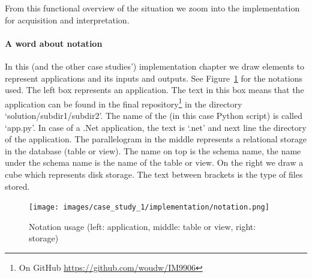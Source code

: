 \documentclass{ou-report}
\begin{document}
From this functional overview of the situation we zoom into the implementation
for acquisition and interpretation.

\paragraph{A word about notation}
In this (and the other case studies') implementation chapter we draw elements to
represent applications and its inputs and outputs. See Figure~\ref{fig:notation}
for the notations used. 
The left box represents an application. The text in this box means that
the application can be found in the final repository\footnote{On GitHub
\url{https://github.com/woudw/IM9906}} in the directory `solution/subdir1/subdir2'.
The name of the (in this case Python script) is called `app.py'. In case of a .Net 
application, the text is `.net' and next line the directory of the application.
The parallelogram in the middle represents a relational storage in the database (table or 
view). The name on top is the schema name, the name under the schema name is the name 
of the table or view.
On the right we draw a cube which represents disk storage. The text between brackets
is the type of files stored.

\begin{figure}[H]
    \centering
    \texttt{[image: images/case\_study\_1/implementation/notation.png]}
    \caption{Notation usage (left: application, middle: table or view, right: storage)}
    \label{fig:notation}
\end{figure}





\end{document}
